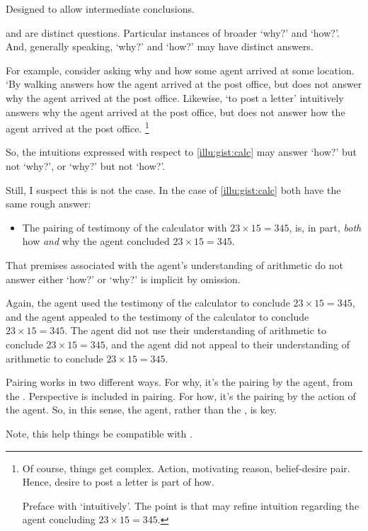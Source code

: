 \begin{note}
  \color{red}
  Designed to allow intermediate conclusions.
\end{note}

\begin{note}
  \qWhy{} and \qHow{} are distinct questions.
  Particular instances of broader `why?' and `how?'.
  And, generally speaking, `why?' and `how?' may have distinct answers.

  For example, consider asking why and how some agent arrived at some location.
  `By walking answers how the agent arrived at the post office, but does not answer why the agent arrived at the post office.
  Likewise, `to post a letter' intuitively answers why the agent arrived at the post office, but does not answer how the agent arrived at the post office.%
  \footnote{
    Of course, things get complex.
    Action, motivating reason, belief-desire pair.
    Hence, desire to post a letter is part of how.

    Preface with `intuitively'.
    The point is that may refine intuition regarding the agent concluding \(23 \times 15 = 345\).
  }

  So, the intuitions expressed with respect to \autoref{illu:gist:calc} may answer `how?' but not `why?', or `why?' but not `how?'.

  Still, I suspect this is not the case.
  In the case of \autoref{illu:gist:calc} both have the same rough answer:

  \begin{itemize}
  \item
    The pairing of testimony of the calculator with \(23 \times 15 = 345\), is, in part, \emph{both} how \emph{and} why the agent concluded \(23 \times 15 = 345\).
  \end{itemize}
  That premises associated with the agent's understanding of arithmetic do not answer either `how?' or `why?' is implicit by omission.

  Again, the agent used the testimony of the calculator to conclude \(23 \times 15 = 345\), and the agent appealed to the testimony of the calculator to conclude \(23 \times 15 = 345\).
  The agent did not use their understanding of arithmetic to conclude \(23 \times 15 = 345\), and the agent did not appeal to their understanding of arithmetic to conclude \(23 \times 15 = 345\).
\end{note}

\begin{note}
  \color{red}
  Pairing works in two different ways.
  For why, it's the pairing by the agent, from the \agpe{}.
  Perspective is included in pairing.
  For how, it's the pairing by the action of the agent.
  So, in this sense, the agent, rather than the \agpe{}, is key.

  Note, this help things be compatible with \citeauthor{Davidson:1963aa}.
\end{note}

